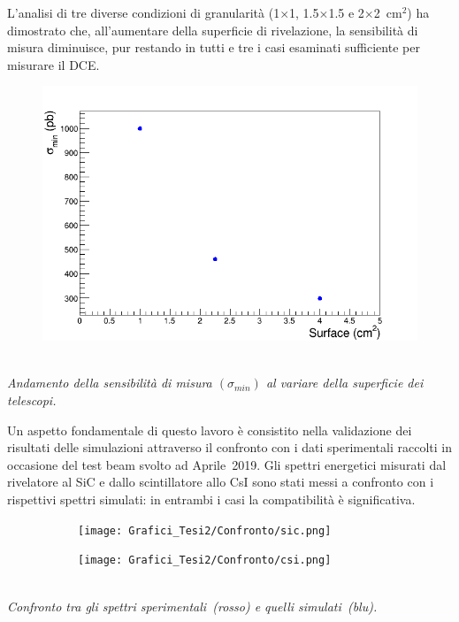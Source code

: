 \documentclass[10pt,foldmark,notumble]{leaflet}
\begin{document}
L'analisi di tre diverse condizioni di granularità (1$\times$1, 1.5$\times$1.5 e 2$\times$2~$\mbox{cm}^2$) ha dimostrato che, all'aumentare della superficie di rivelazione, la sensibilità di misura diminuisce, pur restando in tutti e tre i casi esaminati sufficiente per misurare il DCE.\\
\begin{figure} [!h]
	\centering
	\includegraphics[width=0.8\columnwidth, keepaspectratio]{Grafici_Tesi2/Granularitanew/sigma_min.png}
\end{figure}\\
\textit{Andamento della sensibilità di misura $(\sigma_{min})$ al variare della superficie dei telescopi.}

Un aspetto fondamentale di questo lavoro è consistito nella validazione dei risultati delle simulazioni attraverso il confronto con i dati sperimentali raccolti in occasione del test beam svolto ad Aprile~2019.
Gli spettri energetici misurati dal rivelatore al SiC e dallo scintillatore allo CsI sono stati messi a confronto con i rispettivi spettri simulati: in entrambi i casi la compatibilità è significativa.\\
\begin{figure}[h]
	\begin{subfigure}
		\centering
		\texttt{[image: Grafici\_Tesi2/Confronto/sic.png]}
	\end{subfigure}
	\begin{subfigure}
		\centering
		\texttt{[image: Grafici\_Tesi2/Confronto/csi.png]}
	\end{subfigure}
\end{figure}\\
\textit{Confronto tra gli spettri sperimentali~(rosso) e quelli simulati~(blu).}
\end{document}
